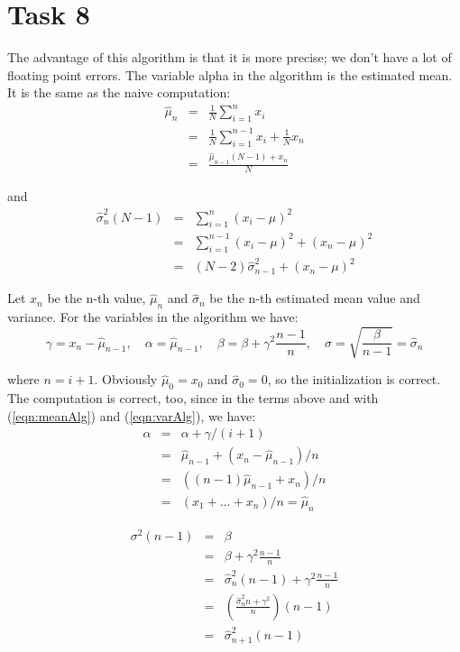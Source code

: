 \documentclass[]{article}
\begin{document}
\clearpage
\section*{Task 8} The advantage of this algorithm is that it is more precise; we
don't have a lot of floating point errors. The variable alpha in the algorithm
is the estimated mean. It is the same as the naive computation: 
\begin{eqnarray}
    \hat{\mu}_n &= &\frac{1}{N}\sum_{i=1}^n x_i\nonumber\\
    &=&\frac{1}{N}\sum_{i=1}^{n-1}x_i+\frac{1}{N}x_n\nonumber\\
    &=&\frac{\hat{\mu}_{n-1}\left(N-1\right)+x_n}{N}\label{eqn:meanAlg}
\end{eqnarray}

and
\begin{eqnarray}
    \hat{\sigma}^{2}_n\left(N-1\right) &= &\sum_{i=1}^n
    \left(x_i-\mu\right)^2\nonumber\\
    &=&\sum_{i=1}^{n-1}\left(x_i-\mu\right)^2
    +\left(x_n-\mu\right)^2\nonumber\\
    &=&\left(N-2\right)\hat{\sigma}^{2}_{n-1} +
    \left(x_n-\mu\right)^2\label{eqn:varAlg}
\end{eqnarray}

Let $x_n$ be the n-th value, $\hat{\mu}_n$ and $\hat{\sigma}_n$ be the n-th
estimated mean value and variance.  For the variables in the
algorithm we have:
\[\gamma=x_n-\hat{\mu}_{n-1},\quad \alpha=\hat{\mu}_{n-1},\quad \beta = \beta +
\gamma^2\frac{n-1}{n},\quad \sigma = \sqrt{\frac{\beta}{n-1}} =
\hat{\sigma}_{n}\]

where $n=i+1$. Obviously $\hat{\mu}_0=x_0$ and $\hat{\sigma}_0 = 0$, so the initialization is
correct. The computation is correct, too, since in the terms above and with
(\ref{eqn:meanAlg}) and (\ref{eqn:varAlg}), we have:
\begin{eqnarray*}
      \alpha & = &\alpha+\gamma/(i+1) \\
      & = &\hat{\mu}_{n-1}+(x_n-\hat{\mu}_{n-1})/n \\
      & = &((n-1)\hat{\mu}_{n-1}+x_n)/n \\
      & = &(x_1+...+x_n)/n = \hat{\mu}_{n}
\end{eqnarray*} 

\begin{eqnarray*}
      \sigma^2 \left(n-1\right) & = & \beta \\
      & = & \beta + \gamma^2\frac{n-1}{n}\\
      & = & \hat{\sigma}^{2}_n\left(n-1\right) + \gamma^2\frac{n-1}{n}\\
      & = & \left(\frac{\hat{\sigma}^{2}_n n+\gamma^2}{n}\right)\left(n-1\right)
      \\
      & = & \hat{\sigma}^{2}_{n+1}\left(n-1\right)
\end{eqnarray*} 
\end{document}
